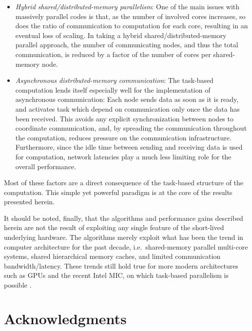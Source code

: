 \documentclass[final]{siamltex}
\begin{document}
\begin{itemize}
    \item {\em Hybrid shared/distributed-memory parallelism}: One of the
        main issues with massively parallel codes is that, as the number
        of involved cores increases, so does the ratio of communication
        to computation for each core, resulting in an eventual loss of scaling.
        In taking a hybrid shared/distributed-memory parallel approach,
        the number of communicating nodes, and thus the total communication,
        is reduced by a factor of the number of cores per shared-memory node.
        
    \item {\em Asynchronous distributed-memory communication}: The task-based
        computation lends itself especially well for the implementation
        of asynchronous communication: Each node sends data as soon
        as it is ready, and activates task which depend on communication
        only once the data has been received.
        This avoids any explicit synchronization between nodes to coordinate
        communication, and, by spreading the communication throughout the
        computation, reduces pressure on the communication infrastructure.
        Furthermore, since the idle time between sending and receiving
        data is used for computation, network latencies play a much
        less limiting role for the overall performance.
    
\end{itemize}

Most of these factors are a direct consequence of the task-based
structure of the computation.
This simple yet powerful paradigm is at the core of the results
presented herein.

It should be noted, finally, that the algorithms and performance gains
described herein are not the result of exploiting any single feature
of the short-lived underlying hardware.
The algorithms merely exploit what has been the trend in computer
architecture for the past decade, i.e.~shared-memory parallel multi-core
systems, shared hierarchical memory caches, and limited communication
bandwidth/latency.
These trends still hold true for more modern architectures such as
GPUs and the recent Intel MIC, on which task-based parallelism
is possible \cite{ref:Chalk2014}.


\section*{Acknowledgments}
\end{document}
